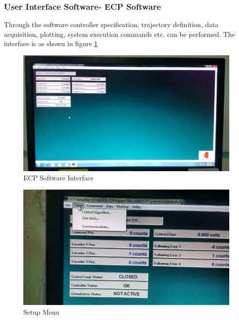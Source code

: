 \documentclass[11pt, a4paper]{article}
\begin{document}
\subsubsection{User Interface Software- ECP Software}
Through the software controller specification, trajectory definition, data acquisition, plotting, system execution commands etc. can be performed. The interface is as shown in figure \ref{Fig3}
\begin{figure}[H]
\centering
\includegraphics[width = \textwidth]{sw_interface.png}
\caption{ECP Software Interface}
\label{Fig3}
\end{figure}
\begin{figure}[H]
\centering
\includegraphics[width = \textwidth]{setup_menu.png}
\caption{Setup Menu}
\label{Fig4}
\end{figure}
\end{document}
